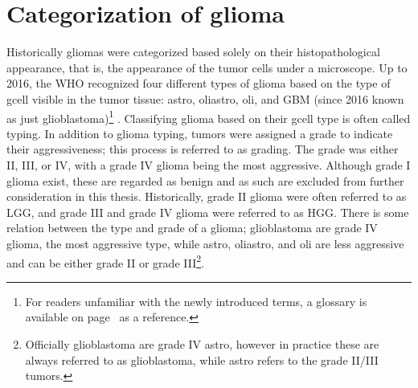 \section{Categorization of glioma}
Historically \glspl{glioma} were categorized based solely on their histopathological appearance, that is, the appearance of the \gls{tumor} cells under a microscope.
Up to 2016, the \gls{WHO} recognized four different types of \gls{glioma} based on the type of \gls{gcell} visible in the \gls{tumor} tissue: \gls{astro}, \gls{oliastro}, \gls{oli}, and \gls{GBM} (since 2016 known as just \gls{glioblastoma})\footnote{For readers unfamiliar with the newly introduced terms, a glossary is available on page~\pageref{glossary} as a reference.} \autocite{louis2007who}.
Classifying \gls{glioma} based on their \gls{gcell} type is often called typing.
In addition to \gls{glioma} typing, \glspl{tumor} were assigned a grade to indicate their aggressiveness; this process is referred to as grading.
The grade was either II, III, or IV, with a grade IV \gls{glioma} being the most aggressive.
Although grade I \gls{glioma} exist, these are regarded as benign and as such are excluded from further consideration in this thesis.
Historically, grade II \gls{glioma} were often referred to as \gls{LGG}, and grade III and grade IV \gls{glioma} were referred to as \gls{HGG}.
There is some relation between the type and grade of a glioma; \gls{glioblastoma} are grade IV glioma, the most aggressive type, while \gls{astro}, \gls{oliastro}, and \gls{oli} are less aggressive and can be either grade II or grade III\footnote{Officially \gls{glioblastoma} are grade IV \gls{astro}, however in practice these are always referred to as \gls{glioblastoma}, while \gls{astro} refers to the grade II/III \glspl{tumor}.}.


